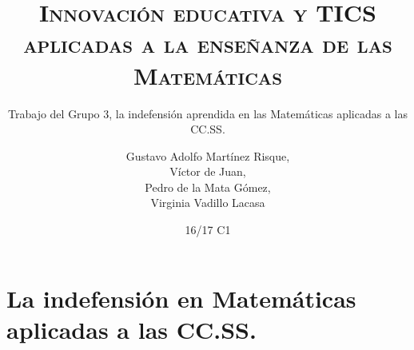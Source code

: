 \documentclass[palatino,nochap,miniheader,nobuilddate]{apuntesURJC}
\title{\textsc{Innovación educativa y TICS aplicadas a la enseñanza de las Matemáticas}}
\subtitle{Trabajo del Grupo 3, la indefensión aprendida en las Matemáticas aplicadas a las CC.SS.}
\author{
Gustavo Adolfo Martínez Risque,\\
Víctor de Juan,\\
Pedro de la Mata Gómez,\\
Virginia Vadillo Lacasa}
\date{16/17 C1}
\begin{document}
\pagestyle{plain}



\maketitle
\leavevmode\thispagestyle{empty}\newpage
\tableofcontents
\newpage

%

\chapter{La indefensión en Matemáticas aplicadas a las CC.SS.}


%

\end{document}

